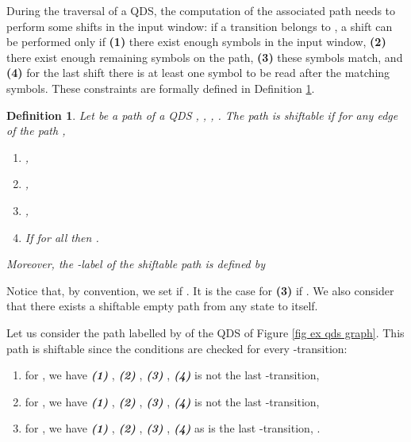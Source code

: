 \documentclass[11pt]{elsarticle}
\newtheorem{definition}{Definition}
\newcommand\modif[2]{{#2}}
\begin{document}
  
  During the traversal of a QDS, the computation of the associated path needs to perform some shifts in the input window: if a transition  belongs to \modif{}{}, a shift can be performed only if \textbf{(1)} there exist enough symbols in the input window, \textbf{(2)} there exist enough remaining symbols on the path, \textbf{(3)} these symbols match, and \textbf{(4)} for the last shift there is at least one symbol to be read after the  matching symbols. These constraints are formally defined in Definition \ref{def shiftable}.
  
  \begin{definition}\label{def shiftable}
    Let  be a path of a QDS , , , . The path  is \emph{shiftable} if for any edge  of the path , 
  \begin{enumerate}
  \item[ \emph{\textbf{(1)}}] ,
  \item[ \emph{\textbf{(2)}}] ,
  \item[ \emph{\textbf{(3)}}] ,\item[ \emph{\textbf{(4)}}]  If   for all     then  .

    \end{enumerate}
  Moreover, the \emph{-label}  of the shiftable path  is defined by
   
 

   
    
\end{definition}
Notice that, by convention, we set  if . It is the case for  \textbf{(3)} if .
  We also consider that there exists a shiftable empty path  from any state  to itself.


  \begin{example}\label{ex exp chemin decal}
    Let us consider the path  labelled by  of the QDS of Figure \ref{fig ex qds graph}.
This path is shiftable since  the conditions are checked for every -transition:
 \begin{enumerate}
\item for , we have \emph{\textbf{(1)}} , \emph{\textbf{(2)}} , \emph{\textbf{(3)}} , \emph{\textbf{(4)}}  is not the last -transition,
\item for , we have \emph{\textbf{(1)}} , \emph{\textbf{(2)}} , \emph{\textbf{(3)}} , \emph{\textbf{(4)}}  is not the last -transition,
\item for , we have \emph{\textbf{(1)}} , \emph{\textbf{(2)}} , \emph{\textbf{(3)}} , \emph{\textbf{(4)}} as  is  the last -transition, .
 \end{enumerate}
  \end{example}
  
\end{document}
